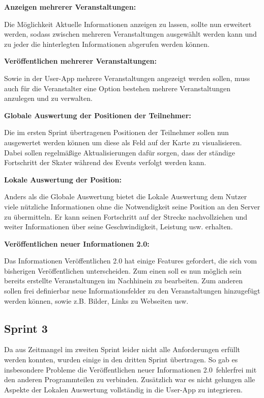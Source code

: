 \documentclass[a4paper, titlepage]{scrartcl}
\begin{document}
\textbf{Anzeigen mehrerer Veranstaltungen:}

Die Möglichkeit Aktuelle Informationen anzeigen zu lassen, sollte nun erweitert werden, sodass zwischen mehreren Veranstaltungen ausgewählt werden kann und zu jeder die hinterlegten Informationen abgerufen werden können.

\textbf{Veröffentlichen mehrerer Veranstaltungen:}

Sowie in der User-App mehrere Veranstaltungen angezeigt werden sollen, muss auch für die Veranstalter eine Option bestehen mehrere Veranstaltungen anzulegen und zu verwalten.

\textbf{Globale Auswertung der Positionen der Teilnehmer:}

Die im ersten Sprint übertragenen Positionen der Teilnehmer sollen nun ausgewertet werden können um diese als Feld auf der Karte zu visualisieren. Dabei sollen regelmäßige Aktualisierungen dafür sorgen, dass der ständige Fortschritt der Skater während des Events verfolgt werden kann.

\textbf{Lokale Auswertung der Position:}

Anders als die Globale Auswertung bietet die Lokale Auswertung dem Nutzer viele nützliche Informationen ohne die Notwendigkeit seine Position an den Server zu übermitteln. Er kann seinen Fortschritt auf der Strecke nachvollziehen und weiter Informationen über seine Geschwindigkeit, Leistung usw. erhalten.

\textbf{Veröffentlichen neuer Informationen 2.0:}

Das Informationen Veröffentlichen 2.0 hat einige Features gefordert, die sich vom bisherigen Veröffentlichen unterscheiden. Zum einen soll es nun möglich sein bereits erstellte Veranstaltungen im Nachhinein zu bearbeiten. Zum anderen sollen frei definierbar neue Informationsfelder zu den Veranstaltungen hinzugefügt werden können, sowie z.B. Bilder, Links zu Webseiten usw.



\subsection{Sprint 3}
Da aus Zeitmangel im zweiten Sprint leider nicht alle Anforderungen erfüllt werden konnten, wurden einige in den dritten Sprint übertragen. So gab es insbesondere Probleme die \glqq Veröffentlichen neuer Informationen 2.0\grqq\ fehlerfrei mit den anderen Programmteilen zu verbinden. Zusätzlich war es nicht gelungen alle Aspekte der Lokalen Auswertung vollständig in die User-App zu integrieren.
\end{document}

